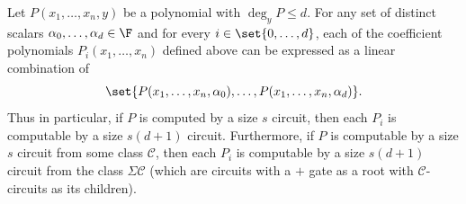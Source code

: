 \begin{lemma}[Interpolation]\label{lem:interpolation}
Let $P(x_1,\ldots, x_n, y)$ be a polynomial with $\deg_y P \leq d$. For any set of distinct scalars $\alpha_0, \ldots, \alpha_{d} \in \F$ and for every $i \in \set{0,\ldots, d}$,  each of the coefficient polynomials $P_i(x_1,\ldots, x_n)$ defined above can be expressed as a linear combination of 
\[
\set{P(x_1,\ldots, x_n, \alpha_0), \ldots, P(x_1,\ldots, x_n,\alpha_d)}.
\]
Thus in particular, if $P$ is computed by a size $s$ circuit, then each $P_i$ is computable  by a size $s(d+1)$ circuit. Furthermore, if $P$ is computable by a size $s$ circuit from some class $\mathcal{C}$, then each $P_i$ is computable by a size $s(d+1)$ circuit from the class $\Sigma \mathcal{C}$ (which are circuits with a $+$ gate as a root with $\mathcal{C}$-circuits as its children).
\end{lemma}
